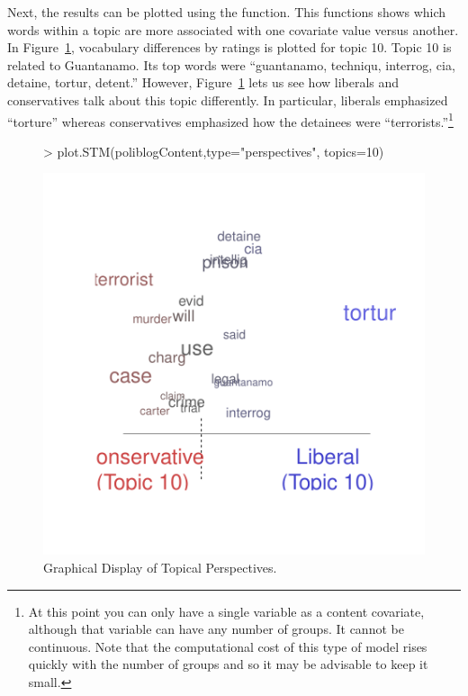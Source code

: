 \documentclass[nojss]{jss}
\begin{document}
\begin{Schunk}
\end{Schunk}

Next, the results can be plotted using the  function.  This functions shows which words within a topic are more associated with one covariate value versus another. In Figure~\ref{fig:perp}, vocabulary differences by ratings is plotted for topic 10. Topic 10 is related to Guantanamo. Its top words were ``guantanamo, techniqu, interrog, cia, detaine, tortur, detent.'' However, Figure~\ref{fig:perp} lets us see how liberals and conservatives talk about this topic differently. In particular, liberals emphasized ``torture'' whereas conservatives emphasized how the detainees were ``terrorists.''\footnote{At this point you can only
 have a single variable as a content covariate, although that variable can have any number of groups. It cannot be continuous. Note that the computational cost of this type of model rises quickly with the number of groups and so it may be advisable to keep it small.}

\begin{figure}[t!]
\begin{center}
\begin{Schunk}
\begin{Sinput}
> plot.STM(poliblogContent,type="perspectives", topics=10)
\end{Sinput}
\end{Schunk}
\includegraphics{stmVignette-018}
\caption{Graphical Display of Topical Perspectives.}
\label{fig:perp}
\end{center}
\end{figure}
\end{document}
